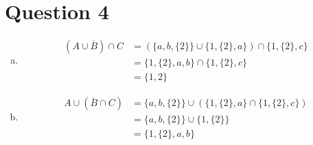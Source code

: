 \documentclass{article}
\begin{document}
\section*{Question 4}
\begin{enumerate}[(a)]
    \item
    \begin{align*}(A \cup \overline{B}) \cap C &= (\{a, b, \{2\}\} \cup \{1, \{2\}, a \}) \cap \{1, \{2\}, c\} \\
        &= \{1, \{2\}, a, b\} \cap \{1, \{2\}, c\} \\
        &= \{1, 2\}
    \end{align*}
    \item
    \begin{align*}
        A \cup (\overline{B} \cap C) &= \{a, b, \{2\}\} \cup (\{1, \{2\}, a\} \cap \{1, \{2\}, c\}) \\
        &= \{a, b, \{2\}\} \cup \{1, \{2\}\} \\
        &= \{1, \{2\}, a, b\}
    \end{align*}
\end{enumerate}
\end{document}
